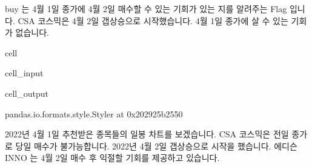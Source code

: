 \documentclass[letterpaper,10pt,english]{jupyterBook}
\begin{document}
\sphinxAtStartPar
 buy 는 4월 1일 종가에 4월 2일 매수할 수 있는 기회가 있는 지를 알려주는 Flag 입니다. CSA 코스믹은 4월 2일 갭상승으로 시작했습니다. 4월 1일 종가에 살 수 있는 기회가 없습니다.

\begin{sphinxuseclass}{cell}\begin{sphinxVerbatimInput}

\begin{sphinxuseclass}{cell_input}
\begin{sphinxVerbatim}[commandchars=\\\{\}]
\PYG{p}{[}\PYG{p}{[} \PYG{p}{]}\PYG{p}{]}
\end{sphinxVerbatim}

\end{sphinxuseclass}\end{sphinxVerbatimInput}
\begin{sphinxVerbatimOutput}

\begin{sphinxuseclass}{cell_output}
\begin{sphinxVerbatim}[commandchars=\\\{\}]
\PYGZlt{}pandas.io.formats.style.Styler at 0x202925b2550\PYGZgt{}
\end{sphinxVerbatim}

\end{sphinxuseclass}\end{sphinxVerbatimOutput}

\end{sphinxuseclass}
\sphinxAtStartPar
2022년 4월 1일 추천받은 종목들의 일봉 차트를 보겠습니다. CSA 코스믹은 전일 종가로 당일 매수가 불가능합니다. 2022년 4월 2일 갭상승으로 시작을 했습니다.  에디슨 INNO 는 4월 2일 매수 후 익절할 기회를 제공하고 있습니다.
\end{document}
